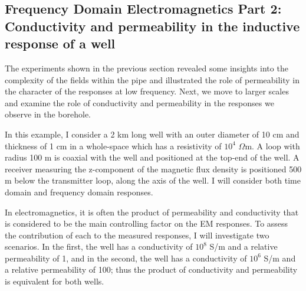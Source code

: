 




\subsection{Frequency Domain Electromagnetics Part 2: Conductivity and permeability in the inductive response of a well}
\label{sec:FDEM_part2}

The experiments shown in the previous section revealed some insights into the complexity of the fields within the pipe and illustrated the role of permeability in the character of the responses at low frequency. Next, we move to larger scales and examine the role of conductivity and permeability in the responses we observe in the borehole.

In this example, I consider a 2 km long well with an outer diameter of 10 cm and thickness of 1 cm in a whole-space which has a resistivity of $10^4$ $\Omega$m. A loop with radius 100 m is coaxial with the well and positioned at the top-end of the well. A receiver measuring the z-component of the magnetic flux density is positioned 500 m below the transmitter loop, along the axis of the well. I will consider both time domain and frequency domain responses.

In electromagnetics, it is often the product of permeability and conductivity that is considered to be the main controlling factor on the EM responses. To assess the contribution of each to the measured responses, I will investigate two scenarios. In the first, the well has a conductivity of $10^8$ S/m and a relative permeability of 1, and in the second, the well has a conductivity of $10^6$ S/m and a relative permeability of 100; thus the product of conductivity and permeability is equivalent for both wells.

